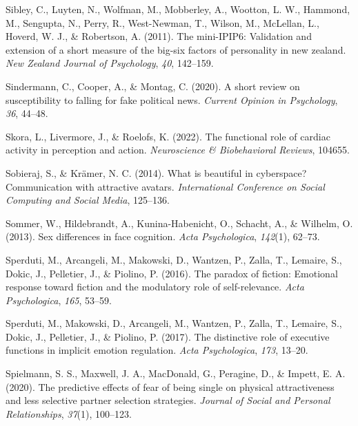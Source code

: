 \documentclass[
  man,floatsintext]{apa6}
\newlength{\cslhangindent}
\newlength{\cslentryspacingunit} %
\newenvironment{CSLReferences}[2] %
 {%
  \setlength{\parindent}{0pt}
  \ifodd #1
  \let\oldpar\par
  \def\par{\hangindent=\cslhangindent\oldpar}
  \fi
  \setlength{\parskip}{#2\cslentryspacingunit}
 }%
 {}
\begin{document}
\begin{CSLReferences}{1}{0}
\leavevmode{}%
Sibley, C., Luyten, N., Wolfman, M., Mobberley, A., Wootton, L. W., Hammond, M., Sengupta, N., Perry, R., West-Newman, T., Wilson, M., McLellan, L., Hoverd, W. J., \& Robertson, A. (2011). The mini-IPIP6: Validation and extension of a short measure of the big-six factors of personality in new zealand. \emph{New Zealand Journal of Psychology}, \emph{40}, 142--159.

\leavevmode{}%
Sindermann, C., Cooper, A., \& Montag, C. (2020). A short review on susceptibility to falling for fake political news. \emph{Current Opinion in Psychology}, \emph{36}, 44--48.

\leavevmode{}%
Skora, L., Livermore, J., \& Roelofs, K. (2022). The functional role of cardiac activity in perception and action. \emph{Neuroscience \& Biobehavioral Reviews}, 104655.

\leavevmode{}%
Sobieraj, S., \& Krämer, N. C. (2014). What is beautiful in cyberspace? Communication with attractive avatars. \emph{International Conference on Social Computing and Social Media}, 125--136.

\leavevmode{}%
Sommer, W., Hildebrandt, A., Kunina-Habenicht, O., Schacht, A., \& Wilhelm, O. (2013). Sex differences in face cognition. \emph{Acta Psychologica}, \emph{142}(1), 62--73.

\leavevmode{}%
Sperduti, M., Arcangeli, M., Makowski, D., Wantzen, P., Zalla, T., Lemaire, S., Dokic, J., Pelletier, J., \& Piolino, P. (2016). The paradox of fiction: Emotional response toward fiction and the modulatory role of self-relevance. \emph{Acta Psychologica}, \emph{165}, 53--59.

\leavevmode{}%
Sperduti, M., Makowski, D., Arcangeli, M., Wantzen, P., Zalla, T., Lemaire, S., Dokic, J., Pelletier, J., \& Piolino, P. (2017). The distinctive role of executive functions in implicit emotion regulation. \emph{Acta Psychologica}, \emph{173}, 13--20.

\leavevmode{}%
Spielmann, S. S., Maxwell, J. A., MacDonald, G., Peragine, D., \& Impett, E. A. (2020). The predictive effects of fear of being single on physical attractiveness and less selective partner selection strategies. \emph{Journal of Social and Personal Relationships}, \emph{37}(1), 100--123.


\end{CSLReferences}
\end{document}
